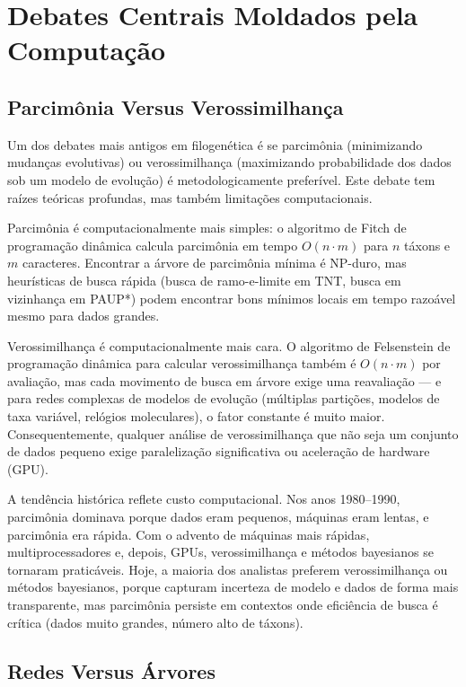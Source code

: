 \section{Debates Centrais Moldados pela Computação}

\subsection{Parcimônia Versus Verossimilhança}

Um dos debates mais antigos em filogenética é se parcimônia (minimizando mudanças evolutivas) ou verossimilhança (maximizando probabilidade dos dados sob um modelo de evolução) é metodologicamente preferível. Este debate tem raízes teóricas profundas, mas também limitações computacionais.

Parcimônia é computacionalmente mais simples: o algoritmo de Fitch de programação dinâmica \parencite{fitch1971} calcula parcimônia em tempo $O(n \cdot m)$ para $n$ táxons e $m$ caracteres. Encontrar a árvore de parcimônia mínima é NP-duro, mas heurísticas de busca rápida (busca de ramo-e-limite em TNT, busca em vizinhança em PAUP*) podem encontrar bons mínimos locais em tempo razoável mesmo para dados grandes.

Verossimilhança é computacionalmente mais cara. O algoritmo de Felsenstein de programação dinâmica para calcular verossimilhança também é $O(n \cdot m)$ por avaliação, mas cada movimento de busca em árvore exige uma reavaliação --- e para redes complexas de modelos de evolução (múltiplas partições, modelos de taxa variável, relógios moleculares), o fator constante é muito maior. Consequentemente, qualquer análise de verossimilhança que não seja um conjunto de dados pequeno exige paralelização significativa ou aceleração de hardware (GPU).

A tendência histórica reflete custo computacional. Nos anos 1980--1990, parcimônia dominava porque dados eram pequenos, máquinas eram lentas, e parcimônia era rápida. Com o advento de máquinas mais rápidas, multiprocessadores e, depois, GPUs, verossimilhança e métodos bayesianos se tornaram praticáveis. Hoje, a maioria dos analistas preferem verossimilhança ou métodos bayesianos, porque capturam incerteza de modelo e dados de forma mais transparente, mas parcimônia persiste em contextos onde eficiência de busca é crítica (dados muito grandes, número alto de táxons).

\subsection{Redes Versus Árvores}

